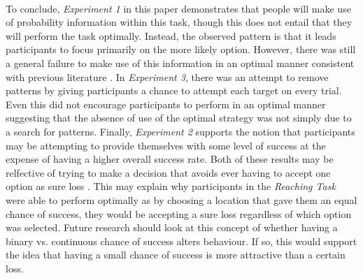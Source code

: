 \documentclass[12pt]{article}
\begin{document}
\paragraph{} To conclude, \textit{Experiment 1} in this paper demonstrates that people will make use of probability information within this task, though this does not entail that they will perform the task optimally. Instead, the observed pattern is that it leads participants to focus primarily on the more likely option. However, there was still a general failure to make use of this information in an optimal manner consistent with previous literature \citep{koehler2014probability}. In \textit{Experiment 3}, there was an attempt to remove patterns by giving participants a chance to attempt each target on every trial. Even this did not encourage participants to perform in an optimal manner suggesting that the absence of use of the optimal strategy was not simply due to a search for patterns. Finally, \textit{Experiment 2} supports the notion that participants may be attempting to provide themselves with some level of success at the expense of having a higher overall success rate. Both of these results may be relfective of trying to make a decision that avoids ever having to accept one option as sure loss \cite{CHAPMAN2010168,KahnemanProspect,Hudson2007probmove}. This may explain why participants in the \textit{Reaching Task} \citep{clarke2015failure} were able to perform optimally as by choosing a location that gave them an equal chance of success, they would be accepting a sure loss regardless of which option was selected. Future research should look at this concept of whether having a binary vs. continuous chance of success alters behaviour. If so, this would support the idea that having a small chance of success is more attractive than a certain loss. 



\clearpage
\begingroup\onehalfspacing
\newpage
{}


\endgroup
\end{document}
